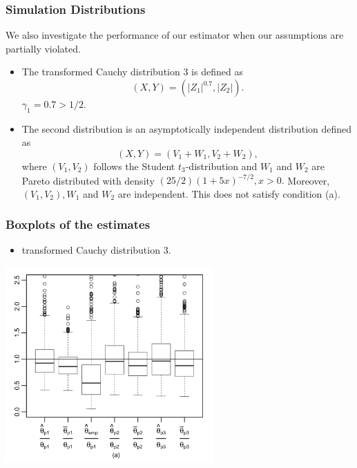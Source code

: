 \documentclass{beamer}
\begin{document}
\begin{frame}
    \frametitle{Simulation Distributions}
    We also investigate the performance of our estimator when our assumptions are partially
    violated.
    \begin{itemize}
    \item The transformed Cauchy distribution 3 is defined as
        $$
        (X, Y)=\left(\left|Z_{1}\right|^{0.7},\left|Z_{2}\right|\right).
        $$
$\gamma_1=0.7>1/2.$
    
    \item The second distribution is an asymptotically independent distribution defined as
        $$
        (X, Y)=\left(V_{1}+W_{1}, V_{2}+W_{2}\right),
        $$
        where $(V_1,V_2)$ follows the Student $t_3$-distribution and $W_1$ and $W_2$ are
        Pareto distributed with density $(25/2)(1+5x)^{-7/2}, x>0.$ Moreover, $(V_1,V_2), W_1$ and $W_2$ are independent. This does not satisfy condition (a).
    \end{itemize}
\end{frame}
\begin{frame}
    \frametitle{Boxplots of the estimates}
\begin{itemize}
    \item transformed Cauchy distribution 3.
\end{itemize}

\includegraphics[width=0.6\textwidth]{2_a.png}


\end{frame}
\end{document}

